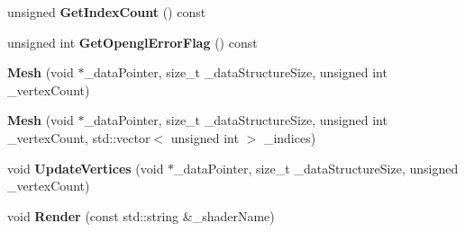 \begin{DoxyCompactItemize}
unsigned {\bfseries Get\+Index\+Count} () const
\item 
\mbox{\label{classpiolot_1_1_mesh_aa0dad39c742e455b1a0fe27731d01737}} 
unsigned int {\bfseries Get\+Opengl\+Error\+Flag} () const
\item 
\mbox{\label{classpiolot_1_1_mesh_a3476df99ba790254513c9e9a3bad02d3}} 
{\bfseries Mesh} (void $\ast$\+\_\+data\+Pointer, size\+\_\+t \+\_\+data\+Structure\+Size, unsigned int \+\_\+vertex\+Count)
\item 
\mbox{\label{classpiolot_1_1_mesh_adc3c74b1c936bb0a4d73e7377d08f319}} 
{\bfseries Mesh} (void $\ast$\+\_\+data\+Pointer, size\+\_\+t \+\_\+data\+Structure\+Size, unsigned int \+\_\+vertex\+Count, std\+::vector$<$ unsigned int $>$ \+\_\+indices)
\item 
\mbox{\label{classpiolot_1_1_mesh_a55e20241728a050db306a531bf6d6c79}} 
void {\bfseries Update\+Vertices} (void $\ast$\+\_\+data\+Pointer, size\+\_\+t \+\_\+data\+Structure\+Size, unsigned \+\_\+vertex\+Count)
\item 
\mbox{\label{classpiolot_1_1_mesh_ad7d1c1d6b25a58d52c6a126cf25e235e}} 
void {\bfseries Render} (const std\+::string \&\+\_\+shader\+Name)
\end{DoxyCompactItemize}

